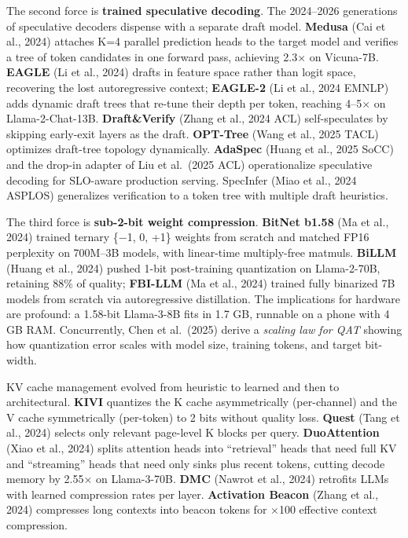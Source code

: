 The second force is \textbf{trained speculative decoding}. The 2024--2026 generations of speculative decoders dispense with a separate draft model. \textbf{Medusa} (Cai et al., 2024) attaches K=4 parallel prediction heads to the target model and verifies a tree of token candidates in one forward pass, achieving 2.3× on Vicuna-7B. \textbf{EAGLE} (Li et al., 2024) drafts in feature space rather than logit space, recovering the lost autoregressive context; \textbf{EAGLE-2} (Li et al., 2024 EMNLP) adds dynamic draft trees that re-tune their depth per token, reaching 4--5× on Llama-2-Chat-13B. \textbf{Draft\&Verify} (Zhang et al., 2024 ACL) self-speculates by skipping early-exit layers as the draft. \textbf{OPT-Tree} (Wang et al., 2025 TACL) optimizes draft-tree topology dynamically. \textbf{AdaSpec} (Huang et al., 2025 SoCC) and the drop-in adapter of Liu et al.~(2025 ACL) operationalize speculative decoding for SLO-aware production serving. SpecInfer (Miao et al., 2024 ASPLOS) generalizes verification to a token tree with multiple draft heuristics.

The third force is \textbf{sub-2-bit weight compression}. \textbf{BitNet b1.58} (Ma et al., 2024) trained ternary \{−1, 0, +1\} weights from scratch and matched FP16 perplexity on 700M--3B models, with linear-time multiply-free matmuls. \textbf{BiLLM} (Huang et al., 2024) pushed 1-bit post-training quantization on Llama-2-70B, retaining 88\% of quality; \textbf{FBI-LLM} (Ma et al., 2024) trained fully binarized 7B models from scratch via autoregressive distillation. The implications for hardware are profound: a 1.58-bit Llama-3-8B fits in 1.7 GB, runnable on a phone with 4 GB RAM. Concurrently, Chen et al.~(2025) derive a \emph{scaling law for QAT} showing how quantization error scales with model size, training tokens, and target bit-width.

KV cache management evolved from heuristic to learned and then to architectural. \textbf{KIVI} quantizes the K cache asymmetrically (per-channel) and the V cache symmetrically (per-token) to 2 bits without quality loss. \textbf{Quest} (Tang et al., 2024) selects only relevant page-level K blocks per query. \textbf{DuoAttention} (Xiao et al., 2024) splits attention heads into ``retrieval'' heads that need full KV and ``streaming'' heads that need only sinks plus recent tokens, cutting decode memory by 2.55× on Llama-3-70B. \textbf{DMC} (Nawrot et al., 2024) retrofits LLMs with learned compression rates per layer. \textbf{Activation Beacon} (Zhang et al., 2024) compresses long contexts into beacon tokens for ×100 effective context compression.

